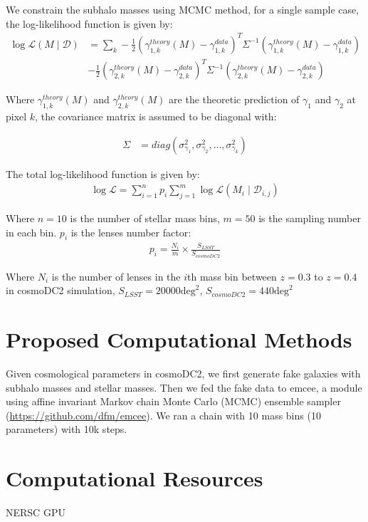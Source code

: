 \documentclass[12pt]{article}
\begin{document}
\begin{small}
We constrain the subhalo masses using MCMC method, for a single sample case, the log-likelihood function is given by:
\begin{align*}
    \log \mathcal{L}(M \mid \mathcal{D}) &= \sum_k -\frac{1}{2}(\gamma^{theory}_{1,k}(M)-\gamma^{data}_{1,k})^T\Sigma^{-1}(\gamma^{theory}_{1,k}(M)-\gamma^{data}_{1,k}) \\ 
    & -\frac{1}{2} (\gamma^{theory}_{2,k}(M)-\gamma^{data}_{2,k})^T\Sigma^{-1}(\gamma^{theory}_{2,k}(M)-\gamma^{data}_{2,k}) 
\end{align*}

Where $\gamma^{theory}_{1,k}(M)$ and  $\gamma^{theory}_{2,k}(M)$ are the theoretic prediction of $\gamma_1$ and $\gamma_2$ at pixel $k$, the covariance matrix is assumed to be diagonal with:

\begin{align*}
    \Sigma &= diag(\sigma_{\gamma_{1}}^2, \sigma_{\gamma_{2}}^2,...,\sigma_{\gamma_{k}}^2)
\end{align*}

The total log-likelihood function is given by:
\begin{align*}
    \log \mathcal{L} = \sum_{i=1}^n p_i \sum_{j=1}^m  \log \mathcal{L}(M_{i}  \mid \mathcal{D}_{i,j})
\end{align*}

Where $n=10$ is the number of stellar mass bins, $m=50$ is the sampling number in each bin. $p_i$ is the lenses number factor:
\begin{align*}
    p_i = \frac{N_i}{m} \times \frac{S_{LSST}}{S_{cosmoDC2}}
\end{align*}

Where $N_i$ is the number of lenses in the $i$th mass bin between $z=0.3$ to $z=0.4$ in cosmoDC2 simulation, $S_{LSST}=20000 \mathrm{deg}^2$, $S_{cosmoDC2}=440 \mathrm{deg}^2$


\section{Proposed Computational Methods}

Given cosmological parameters in cosmoDC2, we first generate fake galaxies with subhalo masses and stellar masses. Then we fed the fake data to emcee, a module using affine invariant Markov chain Monte Carlo (MCMC) ensemble sampler (\url{https://github.com/dfm/emcee}). We ran a chain with 10 mass bins (10 parameters) with 10k steps.

\section{Computational Resources}
NERSC GPU

\end{small}


\end{document}

